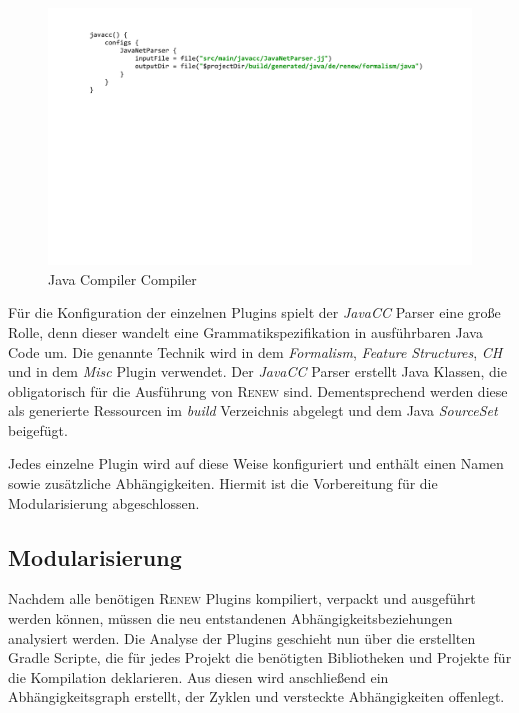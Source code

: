 	\begin{figure}[h!]
	  \centering
	  \includegraphics[width=\textwidth]{material/images/gradle/javacc.pdf}
	  \caption{Java Compiler Compiler}
	  \label{fig:javacc}
	\end{figure}

	Für die Konfiguration der einzelnen Plugins spielt der \textit{JavaCC} Parser eine große Rolle, denn dieser wandelt eine Grammatikspezifikation in ausführbaren Java Code um. Die genannte Technik wird in dem \textit{Formalism}, \textit{Feature Structures}, \textit{CH} und in dem \textit{Misc} Plugin verwendet. Der \textit{JavaCC} Parser erstellt Java Klassen, die obligatorisch für die Ausführung von \textsc{Renew} sind. Dementsprechend werden diese als generierte Ressourcen im \textit{build} Verzeichnis abgelegt und dem Java \textit{SourceSet} beigefügt. \bigbreak

	Jedes einzelne Plugin wird auf diese Weise konfiguriert und enthält einen Namen sowie zusätzliche Abhängigkeiten. Hiermit ist die Vorbereitung für die Modularisierung abgeschlossen. 


\subsection{Modularisierung}	
	Nachdem alle benötigen \textsc{Renew} Plugins kompiliert, verpackt und ausgeführt werden können, müssen die neu entstandenen Abhängigkeitsbeziehungen analysiert werden. Die Analyse der Plugins geschieht nun über die erstellten Gradle Scripte, die für jedes Projekt die benötigten Bibliotheken und Projekte für die Kompilation deklarieren. Aus diesen wird anschließend ein Abhängigkeitsgraph erstellt, der Zyklen und versteckte Abhängigkeiten offenlegt. \bigbreak

